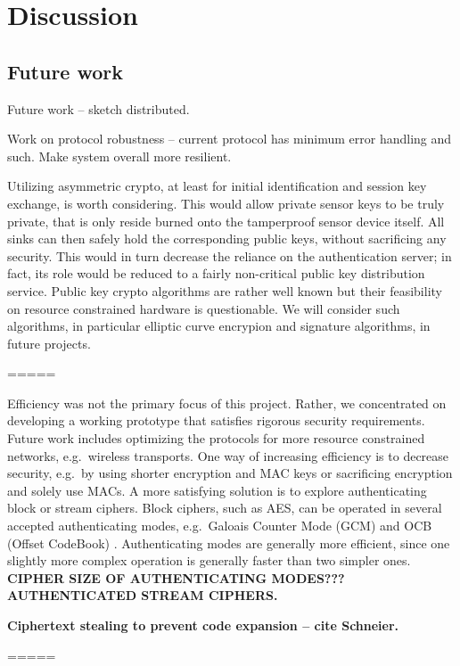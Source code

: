 
\chapter{Discussion}
\label{sec:discussion}

\section{Future work}

Future work -- sketch distributed.

Work on protocol robustness -- current protocol has minimum error handling and such. Make system overall more resilient.

Utilizing asymmetric crypto, at least for initial identification and session key exchange, is worth considering. This would allow private sensor keys to be truly private, that is only reside burned onto the tamperproof sensor device itself. All sinks can then safely hold the corresponding public keys, without sacrificing any security. This would in turn decrease the reliance on the authentication server; in fact, its role would be reduced to a fairly non-critical public key distribution service. Public key crypto algorithms are rather well known but their feasibility on resource constrained hardware is questionable. We will consider such algorithms, in particular elliptic curve \cite{} encrypion and signature algorithms, in future projects.

=====

Efficiency was not the primary focus of this project. Rather, we concentrated on developing a working prototype that satisfies rigorous security requirements. Future work includes optimizing the protocols for more resource constrained networks, e.g.\ wireless transports. One way of increasing efficiency is to decrease security, e.g.\ by using shorter encryption and MAC keys or sacrificing encryption and solely use MACs. A more satisfying solution is to explore authenticating block or stream ciphers. Block ciphers, such as AES, can be operated in several accepted authenticating modes, e.g.\ Galoais Counter Mode (GCM) \cite{} and OCB (Offset CodeBook) \cite{}. Authenticating modes are generally more efficient, since one slightly more complex operation is generally faster than two simpler ones. \textbf{CIPHER SIZE OF AUTHENTICATING MODES???} \textbf{AUTHENTICATED STREAM CIPHERS.}

\textbf{Ciphertext stealing to prevent code expansion -- cite Schneier.}

=====

